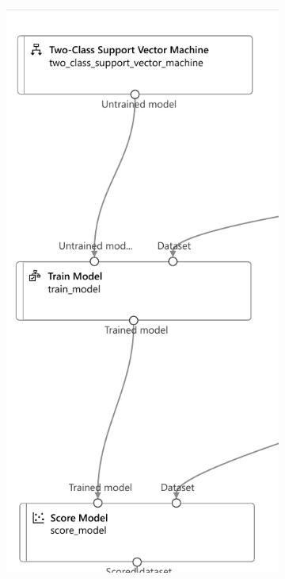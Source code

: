 \begin{figure}[H]
    \begin{subfigure}[m]{0.45\textwidth}
        \centering
        \includegraphics[width=\textwidth]{images/svm_pipe}

\end{subfigure}
\end{figure}
